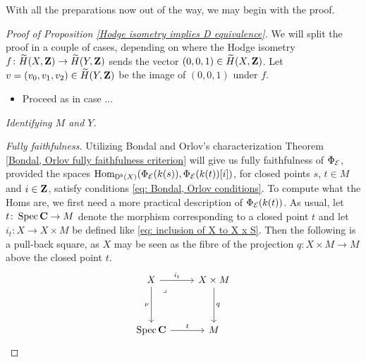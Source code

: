\noindent
With all the preparations now out of the way, we may begin with the proof.
\begin{proof}[Proof of Proposition \ref{Hodge isometry implies D equivalence}]

    We will split the proof in a couple of cases, depending on where the Hodge isometry $f \colon \widetilde{H}(X, \mathbf Z) \to \widetilde{H}(Y, \mathbf Z)$ sends the vector $(0,0,1) \in \widetilde{H}(X, \mathbf Z)$. Let $v = (v_0, v_1, v_2) \in \widetilde{H}(Y, \mathbf Z)$ be the image of $(0,0,1)$ under $f$.
    \begin{itemize}
        \item Proceed as in case ...
    \end{itemize}



    \vspace{0.5 cm}
    \noindent
    \textsl{Identifying $M$ and $Y$.}

    \vspace{0.5 cm}
    \noindent
    \textsl{Fully faithfulness.} Utilizing Bondal and Orlov's characterization Theorem \ref{Bondal, Orlov fully faithfulness criterion} will give us fully faithfulness of $\Phi_{\mathcal E}$, provided the spaces $\operatorname{Hom}_{\mathsf{D}^b(X)}(\Phi_{\mathcal E}(k(s)), \Phi_{\mathcal E}(k(t))[i])$, for closed points $s$, $t \in M$ and $i \in \mathbf Z$, satisfy conditions \eqref{eq: Bondal, Orlov conditions}. To compute what the Homs are, we first need a more practical description of $\Phi_{\mathcal E}(k(t))$. As usual, let $t \colon \operatorname{Spec}\mathbf C \to M$ denote the morphism corresponding to a closed point $t$ and let $i_t \colon X \to X \times M$ be defined like \eqref{eq: inclusion of X to X x S}. Then the following is a pull-back square, as $X$ may be seen as the fibre of the projection $q \colon X \times M \to M$ above the closed point $t$.
    \[\begin{tikzcd}[column sep = small, row sep = 1.8em]
        X && X \times M \\
        \\
        \spec{\C} && M
        \arrow["{i_t}", from=1-1, to=1-3]
        \arrow["{\nu}"', from=1-1, to=3-1]
        \arrow["\lrcorner"{anchor=center, pos=0.125}, draw=none, from=1-1, to=3-3]
        \arrow["{q}", from=1-3, to=3-3]
        \arrow["{t}", from=3-1, to=3-3]
    \end{tikzcd}\]


\end{proof}
